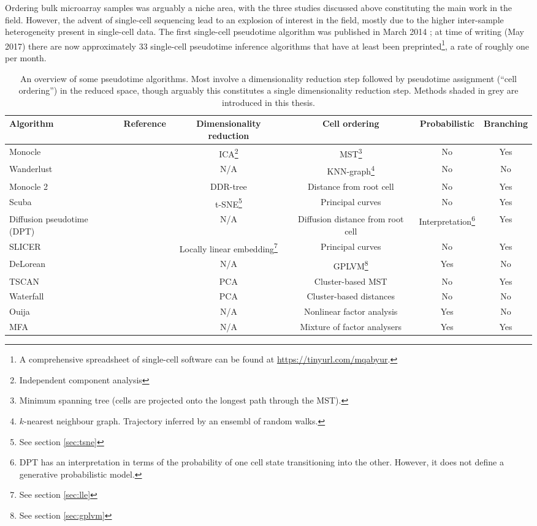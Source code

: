 Ordering bulk microarray samples was arguably a niche area, with the three studies discussed above constituting the main work in the field. However, the advent of single-cell sequencing lead to an explosion of interest in the field, mostly due to the higher inter-sample heterogeneity present in single-cell data. The first single-cell pseudotime algorithm was published in March 2014 \cite{trapnell2014dynamics}; at time of writing (May 2017) there are now approximately 33 single-cell pseudotime inference algorithms that have at least been preprinted\footnote{
A comprehensive spreadsheet of single-cell software can be found at \url{https://tinyurl.com/mqabyur}.
}, a rate of roughly one per month.

\begin{sidewaystable}
  \centering
\begin{tabular}{|lccccc|}
\hline
Algorithm & Reference & Dimensionality reduction & Cell ordering & Probabilistic & Branching \\
\hline
Monocle & \cite{Trapnell2014-xi} & ICA\footnote{Independent component analysis} &
MST\footnote{Minimum spanning tree (cells are projected onto the longest path through the MST).} & No & Yes \\
Wanderlust & \cite{Bendall2014-rc} & N/A & KNN-graph\footnote{$k$-nearest neighbour graph. Trajectory inferred by an ensembl of random walks.} & No & No \\
Monocle 2 & \cite{Qiu2017-eu} & DDR-tree & Distance from root cell & No & Yes \\
Scuba & \cite{Marco2014-ug} & t-SNE\footnote{See section \ref{sec:tsne}} & Principal curves & No & Yes \\
Diffusion pseudotime (DPT) & \cite{Haghverdi2016-eg} & N/A & Diffusion distance from root cell &
Interpretation\footnote{DPT has an interpretation in terms of the probability of one cell state transitioning into the other. However, it does not define a generative probabilistic model.} & Yes \\
SLICER & \cite{welch2016slicer} & Locally linear embedding\footnote{See section \ref{sec:lle}} & Principal curves & No & Yes \\
DeLorean & \cite{reid2016pseudotime} & N/A & GPLVM\footnote{See section \ref{sec:gplvm}} & Yes & No \\
TSCAN & \cite{Ji2016-gx} & PCA & Cluster-based MST & No & Yes \\
Waterfall & \cite{shin2015single} & PCA & Cluster-based distances & No & No \\
\rowcolor{Gray}
Ouija & \cite{Campbell2016-ys} & N/A & Nonlinear factor analysis & Yes & No \\
\rowcolor{Gray}
MFA & \cite{campbell2017probabilistic} & N/A & Mixture of factor analysers & Yes & Yes \\
\hline
\end{tabular}
\caption{An overview of some pseudotime algorithms. Most involve a dimensionality reduction step followed by pseudotime assignment (``cell ordering'') in the reduced space, though arguably this constitutes a single dimensionality reduction step. Methods shaded in grey are introduced in this thesis.} \label{tbl:pseudotimecomparison}
\end{sidewaystable}

